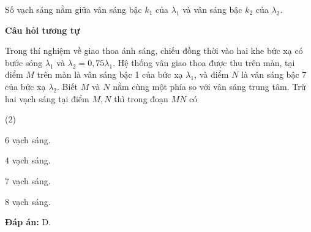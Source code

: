 \begin{dang}{Số vạch sáng nằm giữa vân sáng bậc $k_1$ của $\lambda_1$ và vân sáng bậc $k_2$ của $\lambda_2$.}
{		\begin{center}
			\textbf{Câu hỏi tương tự}
		\end{center}
		
Trong thí nghiệm về giao thoa ánh sáng, chiếu đồng thời vào hai khe bức xạ có bước sóng $ \lambda_{1} $ và $ \lambda_{2} = 0,75 \lambda_{1} $. Hệ thống vân giao thoa được thu trên màn, tại điểm $ M $ trên màn là vân sáng bậc 1 của bức xạ $ \lambda_{1} $, và điểm $ N $ là vân sáng bậc 7 của bức xạ $ \lambda_{2} $. Biết $ M $ và $ N $ nằm cùng một phía so với vân sáng trung tâm. Trừ hai vạch sáng tại điểm $ M, N $ thì trong đoạn $ MN $ có
\begin{mcq}(2)
	\item $ 6 $ vạch sáng.
	\item $ 4 $ vạch sáng.
	\item $ 7 $ vạch sáng.
	\item $ 8 $ vạch sáng.
\end{mcq}

\textbf{Đáp án:} D.
}
\end{dang}


